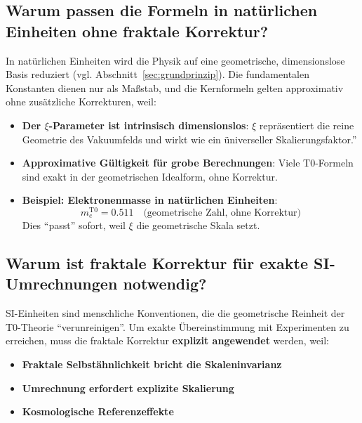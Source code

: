 	\subsection{Warum passen die Formeln in natürlichen Einheiten ohne fraktale Korrektur?}
	
	In natürlichen Einheiten wird die Physik auf eine geometrische, dimensionslose Basis reduziert (vgl. Abschnitt~\ref{sec:grundprinzip}). Die fundamentalen Konstanten dienen nur als Maßstab, und die Kernformeln gelten approximativ ohne zusätzliche Korrekturen, weil:
	
	\begin{itemize}
		\item \textbf{Der $\xi$-Parameter ist intrinsisch dimensionslos}: $\xi$ repräsentiert die reine Geometrie des Vakuumfelds und wirkt wie ein üniverseller Skalierungsfaktor.''
		
		\item \textbf{Approximative Gültigkeit für grobe Berechnungen}: Viele T0-Formeln sind exakt in der geometrischen Idealform, ohne Korrektur.
		
		\item \textbf{Beispiel: Elektronenmasse in natürlichen Einheiten}:
		\begin{equation}
			m_e^{\mathrm{T0}} = 0.511 \quad \text{(geometrische Zahl, ohne Korrektur)}
		\end{equation}
		Dies ``passt'' sofort, weil $\xi$ die geometrische Skala setzt.
	\end{itemize}
	
	\subsection{Warum ist fraktale Korrektur für exakte SI-Umrechnungen notwendig?}
	
	SI-Einheiten sind menschliche Konventionen, die die geometrische Reinheit der T0-Theorie ``verunreinigen''. Um exakte Übereinstimmung mit Experimenten zu erreichen, muss die fraktale Korrektur \textbf{explizit angewendet} werden, weil:
	
	\begin{itemize}
		\item \textbf{Fraktale Selbstähnlichkeit bricht die Skaleninvarianz}
		\item \textbf{Umrechnung erfordert explizite Skalierung}
		\item \textbf{Kosmologische Referenzeffekte}
	\end{itemize}
	
